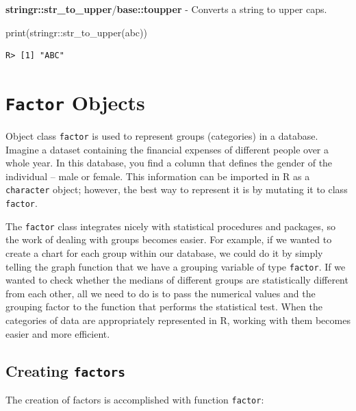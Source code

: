 \documentclass[
  12pt,
]{book}
\newenvironment{Shaded}{\begin{snugshade}}{\end{snugshade}}
\newcommand{\FunctionTok}[1]{\textcolor[rgb]{0,0,0}{#1}}
\newcommand{\NormalTok}[1]{#1}
\newcommand{\SpecialCharTok}[1]{\textcolor[rgb]{0,0,0}{#1}}
\newcommand{\StringTok}[1]{\textcolor[rgb]{0.5,0.5,0.5}{#1}}
\begin{document}
\textbf{stringr::str\_to\_upper}/\textbf{base::toupper} - Converts a string to upper caps.

\begin{Shaded}
\begin{Highlighting}[]
\FunctionTok{print}\NormalTok{(stringr}\SpecialCharTok{::}\FunctionTok{str\_to\_upper}\NormalTok{(}\StringTok{\textquotesingle{}abc\textquotesingle{}}\NormalTok{))}
\end{Highlighting}
\end{Shaded}

\begin{verbatim}
R> [1] "ABC"
\end{verbatim}

\hypertarget{factor-objects}{%
\section{\texorpdfstring{\texttt{Factor} Objects}{Factor Objects}}\label{factor-objects}}

Object class \texttt{factor} is used to represent groups (categories) in a database. Imagine a dataset containing the financial expenses of different people over a whole year. In this database, you find a column that defines the gender of the individual -- male or female. This information can be imported in R as a \texttt{character} object; however, the best way to represent it is by mutating it to class \texttt{factor}.

The \texttt{factor} class integrates nicely with statistical procedures and packages, so the work of dealing with groups becomes easier. For example, if we wanted to create a chart for each group within our database, we could do it by simply telling the graph function that we have a grouping variable of type \texttt{factor}. If we wanted to check whether the medians of different groups are statistically different from each other, all we need to do is to pass the numerical values and the grouping factor to the function that performs the statistical test. When the categories of data are appropriately represented in R, working with them becomes easier and more efficient.

\hypertarget{creating-factors}{%
\subsection{\texorpdfstring{Creating \texttt{factors}}{Creating factors}}\label{creating-factors}}

The creation of factors is accomplished with function \texttt{factor}: 
\end{document}
